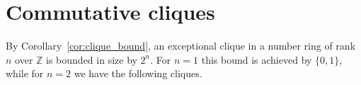 \documentclass{amsart}
\theoremstyle{plain}
\newtheorem{lemma}[theorem]{Lemma}
\theoremstyle{definition}
\newcommand{\tensor}{\otimes}
\newcommand{\Z}{\ensuremath{\mathbb{Z}}}
\begin{document}


\section{Commutative cliques}\label{sec:commutative}

By Corollary~\ref{cor:clique_bound}, an exceptional clique in a number ring of rank \(n\) over \(\Z\) is bounded in size by \(2^n\). For \(n=1\) this bound is achieved by \(\{0,1\}\), while for \(n=2\) we have the following cliques.
\end{document}
